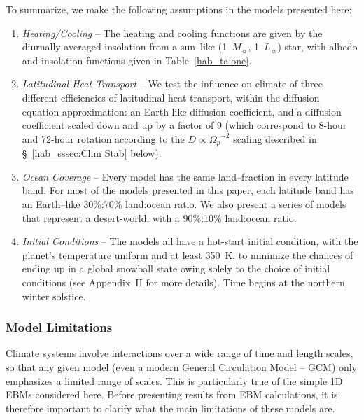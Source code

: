 To summarize, we make the following assumptions in the models
presented here:
\begin{enumerate}
 \item {\it Heating/Cooling} -- The heating and cooling functions are
    given by the diurnally averaged insolation from a sun--like
    (1~$M_\sun$, 1~$L_\sun$) star, with albedo and insolation
    functions given in Table~\ref{hab_ta:one}.
 \item {\it Latitudinal Heat Transport} -- We test the influence on
    climate of three different efficiencies of latitudinal heat
    transport, within the diffusion equation approximation: an
    Earth-like diffusion coefficient, and a diffusion coefficient
    scaled down and up by a factor of 9 (which correspond to 8-hour
    and 72-hour rotation according to the $D\propto {\Omega_p}^{-2}$
    scaling described in \S~\ref{hab_sssec:Clim Stab} below).
 \item {\it Ocean Coverage} -- Every model has the same land--fraction
    in every latitude band.  For most of the models presented in this
    paper, each latitude band has an Earth--like 30\%:70\% land:ocean
    ratio.  We also present a series of models that represent a
    desert-world, with a 90\%:10\% land:ocean ratio.
 \item {\it Initial Conditions} -- The models all have a hot-start
    initial condition, with the planet's temperature uniform and at
    least 350~K, to minimize the chances of ending up in a global
    snowball state owing solely to the choice of initial conditions
    (see Appendix~II for more details).  Time begins at the northern
    winter solstice.
\end{enumerate}


\subsubsection{Model Limitations}
\label{hab_sssec:limits}

Climate systems involve interactions over a wide range of time and
length scales, so that any given model (even a modern General
Circulation Model -- GCM) only emphasizes a limited range of
scales. This is particularly true of the simple 1D EBMs considered
here. Before presenting results from EBM calculations, it is therefore
important to clarify what the main limitations of these models are.

